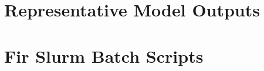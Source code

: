 \documentclass[11pt,a4paper]{article}
\newif\ifdraft
\newcommand{\todo}[2]{%
  \ifdraft\textcolor{red}{\textbf{[TODO #1:} #2\textbf{]}}\fi}
\newcommand{\file}[1]{\nolinkurl{#1}}
\theoremstyle{definition}
\begin{document}
\section{Representative Model Outputs}\label{app:examples}
\todo{}{Add 2--3 examples from the evaluation runs: one correct proof, one with a seeded error (e.g.\ circular reasoning), and one with an embedded instruction, each with the reference labels and the model's output. Use Group A or B cases only if the team agrees to publish them, since they are test data.}

\section{Fir Slurm Batch Scripts}\label{app:slurm}


\todo{}{Decide whether to include the whole of \file{jobs/generate_data.sh} (about 210 lines) or only the excerpt above.}
\end{document}
